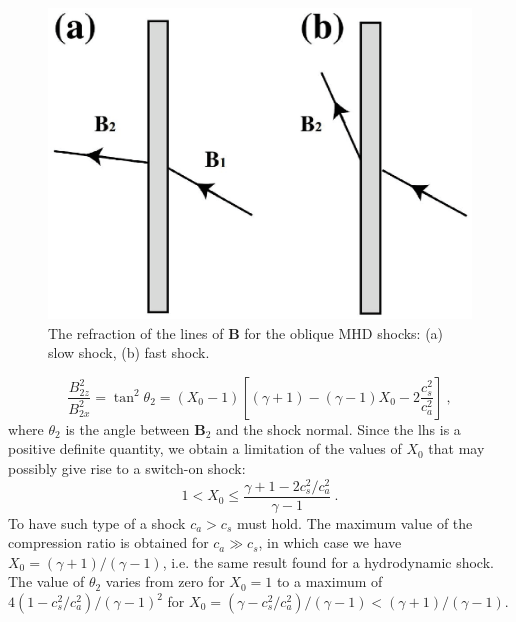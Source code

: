 \documentclass[12pt,a4paper]{article}
\renewcommand{\vec}[1]{\boldsymbol{#1}}
\begin{document}
\begin{figure}
\centering
\includegraphics[height=6.cm,angle=0]{slow_fast_shock.eps}
\caption{
The refraction of the lines of $\vec{B}$ for the oblique MHD shocks: (a) slow shock, (b) fast shock.
} 
\label{fig:slow_fast_shock}
\end{figure}

\begin{equation*}
\frac{B_{2z}^2}{B_{2x}^2} = \tan^2 \theta_2 = (X_0 -1)\left[(\gamma+1) -(\gamma-1)X_0 -2\frac{c_s^2}{c_a^2}  \right] ~,
\end{equation*}
where $\theta_2$ is the angle between $\vec{B}_2$ and the shock normal. Since the lhs is a positive definite quantity, we obtain a limitation of the values of $X_0$ that may possibly give rise to a switch-on shock:
\begin{equation}
1 < X_0 \leqslant \dfrac{\gamma+1-2c_s^2/c_a^2}{\gamma-1} ~.
\end{equation}
To have such type of a shock $c_a > c_s$ must hold. The maximum value of the compression ratio is obtained for $c_a \gg c_s$, in which case we have $X_0 = (\gamma + 1)/(\gamma - 1)$, i.e. the same result found for a hydrodynamic shock. The value of $\theta_2$ varies from zero for $X_0 = 1$ to a maximum of $4(1 - c_s^2/c_a^2)/(\gamma - 1)^2$ for $X_0 = (\gamma - c_s^2/c_a^2)/(\gamma-1) < (\gamma + 1)/(\gamma - 1)$.
\end{document}
